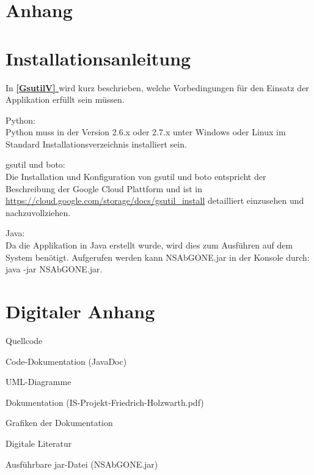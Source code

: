 \documentclass[13pt,a4paper,bibliography=totocnumbered,listof=totocnumbered]{scrartcl}
\newcommand*{\fullref}[1]{\textbf{\hyperref[{#1}]{\ref*{#1} \nameref*{#1}}}}
\begin{document}
\setcounter{page}{1}
\lhead{}

\begin{appendix}
\section*{Anhang}
{}

\section{Installationsanleitung}
In \fullref{GsutilV} wird kurz beschrieben, welche Vorbedingungen für den Einsatz der Applikation erfüllt sein müssen.
\begin{compactitem}
\item{Python:}\\
Python muss in der Version 2.6.x oder 2.7.x unter Windows oder Linux im Standard Installationsverzeichnis installiert sein.
\item{gsutil und boto:}\\
Die Installation und Konfiguration von gsutil und boto entspricht der Beschreibung der Google Cloud Plattform und ist in \url{https://cloud.google.com/storage/docs/gsutil_install} detailliert einzusehen und nachzuvollziehen.
\item{Java:}\\
Da die Applikation in Java erstellt wurde, wird dies zum Ausführen auf dem System benötigt. Aufgerufen werden kann NSAbGONE.jar in der Konsole durch: java -jar NSAbGONE.jar.
\end{compactitem}
\section{Digitaler Anhang}
\begin{compactitem}
\item{Quellcode}
\item{Code-Dokumentation (JavaDoc)}
\item{UML-Diagramme}
\item{Dokumentation (IS-Projekt-Friedrich-Holzwarth.pdf)}
\item{Grafiken der Dokumentation}
\item{Digitale Literatur}
\item{Ausführbare jar-Datei (NSAbGONE.jar)}
\end{compactitem}
\end{appendix}
\end{document}

